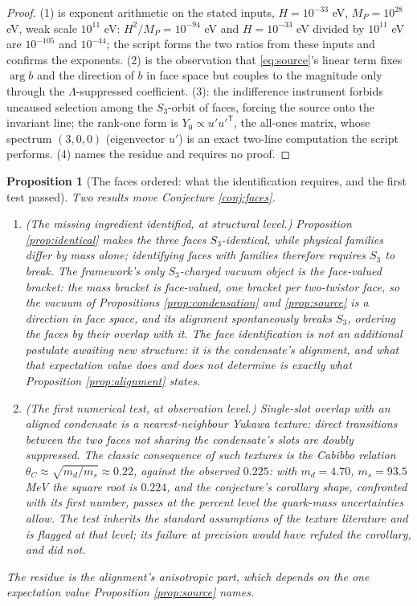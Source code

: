 \documentclass[11pt]{article}
\newtheorem{proposition}[theorem]{Proposition}
\theoremstyle{definition}
\begin{document}
\begin{proof}
(1) is exponent arithmetic on the stated inputs, $H = 10^{-33}$ eV, $M_{P} = 10^{28}$ eV, weak scale $10^{11}$ eV: $H^{2}/M_{P} = 10^{-94}$ eV and $H = 10^{-33}$ eV divided by $10^{11}$ eV are $10^{-105}$ and $10^{-44}$; the script forms the two ratios from these inputs and confirms the exponents. (2) is the observation that \eqref{eq:source}'s linear term fixes $\arg b$ and the direction of $b$ in face space but couples to the magnitude only through the $\Lambda$-suppressed coefficient. (3): the indifference instrument forbids uncaused selection among the $S_{3}$-orbit of faces, forcing the source onto the invariant line; the rank-one form is $Y_{0} \propto u'u'^{\mathsf{T}}$, the all-ones matrix, whose spectrum $(3, 0, 0)$ (eigenvector $u'$) is an exact two-line computation the script performs. (4) names the residue and requires no proof.
\end{proof}

\begin{proposition}[The faces ordered: what the identification requires, and the first test passed]\label{prop:ordered}
Two results move Conjecture \ref{conj:faces}.
\begin{enumerate}
\item \emph{(The missing ingredient identified, at structural level.)} Proposition \ref{prop:identical} makes the three faces $S_{3}$-identical, while physical families differ by mass alone; identifying faces with families therefore requires $S_{3}$ to break. The framework's only $S_{3}$-charged vacuum object is the face-valued bracket: the mass bracket is face-valued, one bracket per two-twistor face, so the vacuum of Propositions \ref{prop:condensation} and \ref{prop:source} is a direction in face space, and its alignment spontaneously breaks $S_{3}$, ordering the faces by their overlap with it. The face identification is not an additional postulate awaiting new structure: it is the condensate's alignment, and what that expectation value does and does not determine is exactly what Proposition \ref{prop:alignment} states.
\item \emph{(The first numerical test, at observation level.)} Single-slot overlap with an aligned condensate is a nearest-neighbour Yukawa texture: direct transitions between the two faces not sharing the condensate's slots are doubly suppressed. The classic consequence of such textures is the Cabibbo relation $\theta_{C} \approx \sqrt{m_{d}/m_{s}} \approx 0.22$, against the observed $0.225$: with $m_{d} = 4.70$, $m_{s} = 93.5$ MeV \cite{PDG2024} the square root is $0.224$, and the conjecture's corollary shape, confronted with its first number, passes at the percent level the quark-mass uncertainties allow. The test inherits the standard assumptions of the texture literature and is flagged at that level; its failure at precision would have refuted the corollary, and did not.
\end{enumerate}
The residue is the alignment's anisotropic part, which depends on the one expectation value Proposition \ref{prop:source} names.
\end{proposition}
\end{document}
